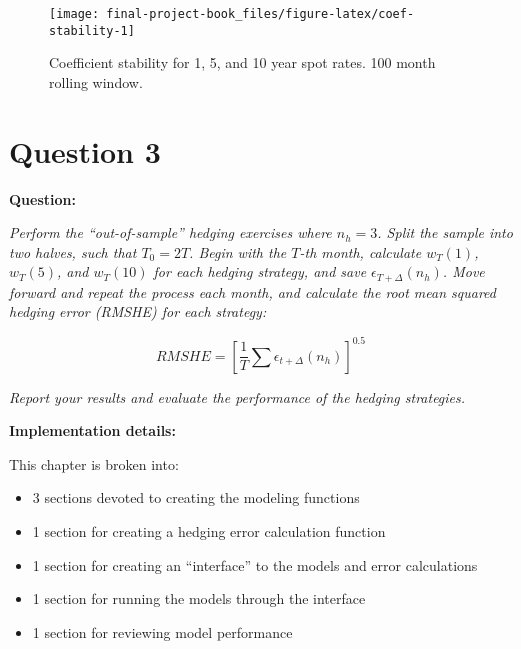 \documentclass[openany]{book}
\providecommand{\tightlist}{%
  \setlength{\itemsep}{0pt}\setlength{\parskip}{0pt}}
\theoremstyle{definition}
\theoremstyle{definition}
\theoremstyle{definition}
\theoremstyle{remark}
\begin{document}
\small

\normalsize

\small

\begin{figure}[H]

{\centering \texttt{[image: final-project-book\_files/figure-latex/coef-stability-1]} 

}

\caption{Coefficient stability for 1, 5, and 10 year spot rates. 100 month rolling window.}\label{fig:coef-stability}
\end{figure}

\normalsize

\small

\normalsize

\hypertarget{q3}{%
\chapter{Question 3}\label{q3}}

\textbf{Question:}

\emph{Perform the ``out-of-sample'' hedging exercises where \(n_h = 3\).
Split the sample into two halves, such that \(T_0 = 2T\). Begin with the
\(T\)-th month, calculate \(w_T(1)\), \(w_T(5)\), and \(w_T(10)\) for
each hedging strategy, and save \(\epsilon_{T+\Delta}(n_h)\). Move
forward and repeat the process each month, and calculate the root mean
squared hedging error (RMSHE) for each strategy:}

\[ RMSHE = [\frac{1}{T} \sum{\epsilon_{t+\Delta}(n_h)}]^{0.5} \]

\emph{Report your results and evaluate the performance of the hedging
strategies.}

\textbf{Implementation details:}

This chapter is broken into:

\begin{itemize}
\tightlist
\item
  3 sections devoted to creating the modeling functions
\item
  1 section for creating a hedging error calculation function
\item
  1 section for creating an ``interface'' to the models and error
  calculations
\item
  1 section for running the models through the interface
\item
  1 section for reviewing model performance
\end{itemize}
\end{document}
